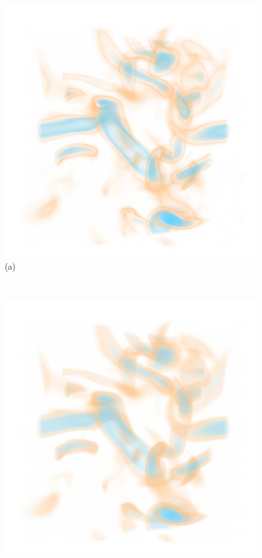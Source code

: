 \documentclass[twoside,twocolumn,10pt]{article}
\begin{document}
\begin{figure}
	\centering
	\begin{minipage}{.16\textwidth}
		\centering
		\includegraphics[width=1\linewidth]{crop/vortex_merged_green_red}
		(a)
	\end{minipage}~
	\begin{minipage}{.16\textwidth}
		\centering
		\includegraphics[width=1\linewidth]{crop/vortex_merged_segment_blend_green_red}

\end{minipage}
\end{figure}
\end{document}
